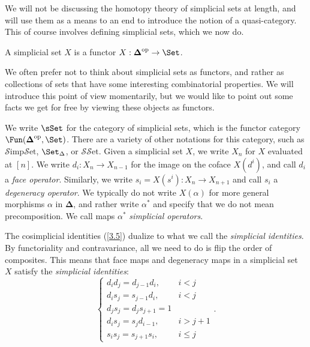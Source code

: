 We will not be discussing the homotopy theory of simplicial sets at length, and will use them as a means to an end to introduce the notion of a quasi-category. This of course involves defining simplicial sets, which we now do.

\begin{definition}\label{3.6}
	A simplicial set $X$ is a functor $X : \boldsymbol{\Delta} ^{\mathrm{op}}  \to \Set $.
\end{definition}

We often prefer not to think about simplicial sets as functors, and rather as collections of sets that have some interesting combinatorial properties. We will introduce this point of view momentarily, but we would like to point out some facts we get for free by viewing these objects as functors.

\begin{notation}\label{3.7}
	We write $\sSet $ for the category of simplicial sets, which is the functor category $\Fun(\boldsymbol{\Delta} ^{\mathrm{op}} ,\Set )$. There are a variety of other notations for this category, such as $\mathcal{S} \mathrm{imp} \mathcal{S} \mathrm{et} $, $\Set _\Delta $, or $\mathcal{S} \mathcal{S} \mathrm{et} $. Given a simplicial set $X$, we write $X_n$ for $X$ evaluated at $[n]$. We write $d_i : X_n \to X_{n-1} $ for the image on the coface $X(d^i)$, and call $d_i$ a \emph{face operator}. Similarly, we write $s_i=X(s^i): X_n \to X_{n+1}$ and call $s_i$ a \emph{degeneracy operator}. We typically do not write $X(\alpha )$ for more general morphisms $\alpha $ in $\boldsymbol{\Delta} $, and rather write $\alpha ^*$ and specify that we do not mean precomposition. We call maps $\alpha ^*$ \emph{simplicial operators}.
\end{notation}


\begin{remark}\label{3.8}
	The cosimplicial identities (\cref{3.5}) dualize to what we call the \emph{simplicial identities}. By functoriality and contravariance, all we need to do is flip the order of composites. This means that face maps and degeneracy maps in a simplicial set $X$ satisfy the \emph{simplicial identities}:
	\[
		\begin{cases}
			d_id_j=d_{j-1} d_i,&i<j\\
			d_is_j=s_{j-1} d_i,&i<j\\
			d_js_j=d_js_{j+1} =1&\\
			d_is_j=s_jd_{i-1} ,&i>j+1\\
			s_is_j=s_{j+1} s_i,&i\leq j
		\end{cases}
	.\]
\end{remark}

